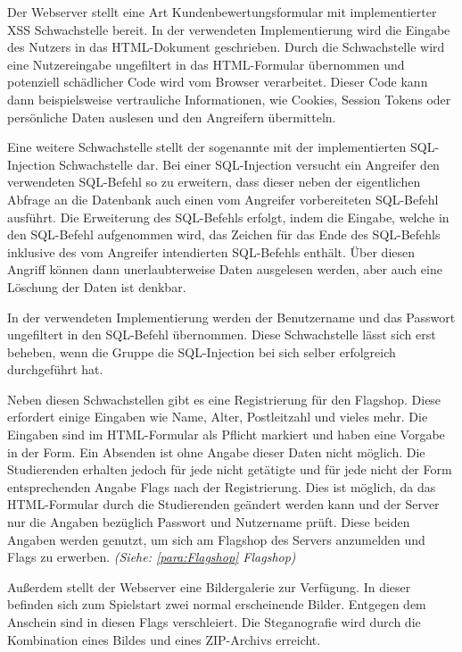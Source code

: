 Der Webserver stellt eine Art Kundenbewertungsformular mit implementierter XSS Schwachstelle bereit. In der verwendeten Implementierung wird die Eingabe des Nutzers in das HTML-Dokument geschrieben. Durch die Schwachstelle wird eine Nutzereingabe ungefiltert in das HTML-Formular übernommen und potenziell schädlicher Code wird vom Browser verarbeitet. Dieser Code kann dann beispielsweise vertrauliche Informationen, wie Cookies, Session Tokens oder persönliche Daten auslesen und den Angreifern übermitteln. \cite{ruettenSicherheitWebanwendungen2007}

Eine weitere Schwachstelle stellt der sogenannte  mit der implementierten SQL-Injection Schwachstelle dar. 
Bei einer SQL-Injection versucht ein Angreifer den verwendeten SQL-Befehl so zu erweitern, dass dieser neben der eigentlichen Abfrage an die Datenbank auch einen vom Angreifer vorbereiteten SQL-Befehl ausführt. Die Erweiterung des SQL-Befehls erfolgt, indem die Eingabe, welche in den SQL-Befehl aufgenommen wird, das Zeichen für das Ende des SQL-Befehls inklusive des vom Angreifer intendierten SQL-Befehls enthält. Über diesen Angriff können dann unerlaubterweise Daten ausgelesen werden, aber auch eine Löschung der Daten ist denkbar. \cite{bachfeldGiftspritze2004}

In der verwendeten Implementierung werden der Benutzername und das Passwort ungefiltert in den SQL-Befehl übernommen. Diese Schwachstelle lässt sich erst beheben, wenn die Gruppe die SQL-Injection bei sich selber erfolgreich durchgeführt hat. \cite[S.27-29]{abtsUeberarbeitungUndErweiterung2016}

Neben diesen Schwachstellen gibt es eine Registrierung für den Flagshop. Diese erfordert einige Eingaben wie Name, Alter, Postleitzahl und vieles mehr. Die Eingaben sind im HTML-Formular als Pflicht markiert und haben eine Vorgabe in der Form. Ein Absenden ist ohne Angabe dieser Daten nicht möglich. Die Studierenden erhalten jedoch für jede nicht getätigte und für jede nicht der Form entsprechenden Angabe Flags nach der Registrierung. \cite[S.26]{abtsUeberarbeitungUndErweiterung2016} Dies ist möglich, da das HTML-Formular durch die Studierenden geändert werden kann und der Server nur die Angaben bezüglich Passwort und Nutzername prüft. Diese beiden Angaben werden genutzt, um sich am Flagshop des Servers anzumelden und Flags zu erwerben. \textit{(Siehe: \autoref{para:Flagshop} Flagshop)}

Außerdem stellt der Webserver eine Bildergalerie zur Verfügung. In dieser befinden sich zum Spielstart zwei normal erscheinende Bilder. Entgegen dem Anschein sind in diesen Flags verschleiert. Die Steganografie wird durch die Kombination eines Bildes und eines ZIP-Archivs erreicht. \cite[S.27]{abtsUeberarbeitungUndErweiterung2016}
